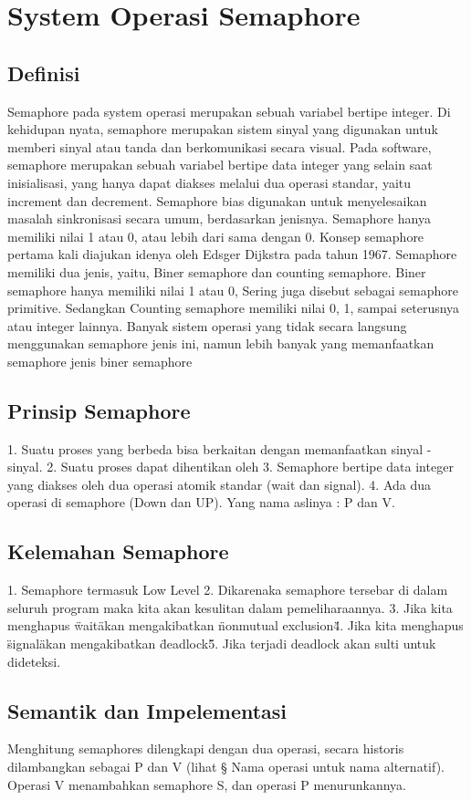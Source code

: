 \section{System Operasi Semaphore}
\subsection{Definisi}
Semaphore pada system operasi merupakan sebuah variabel bertipe integer. Di kehidupan nyata, semaphore merupakan sistem sinyal yang
digunakan untuk memberi sinyal atau tanda dan berkomunikasi secara visual. Pada software, semaphore merupakan sebuah variabel bertipe data
integer yang selain saat inisialisasi, yang hanya dapat diakses melalui dua operasi standar, yaitu increment dan decrement. Semaphore bias
digunakan untuk menyelesaikan masalah sinkronisasi secara umum, berdasarkan jenisnya. Semaphore hanya memiliki nilai 1 atau 0, atau lebih
dari sama dengan 0. Konsep semaphore pertama kali diajukan idenya oleh Edsger Dijkstra pada tahun 1967. Semaphore memiliki dua jenis,
yaitu, Biner semaphore dan counting semaphore. Biner semaphore hanya memiliki nilai 1 atau 0, Sering juga disebut sebagai semaphore
primitive. Sedangkan Counting semaphore memiliki nilai 0, 1, sampai seterusnya atau integer lainnya. Banyak sistem operasi yang tidak
secara langsung menggunakan semaphore jenis ini, namun lebih banyak yang memanfaatkan semaphore jenis biner semaphore

\subsection{Prinsip Semaphore}
1. Suatu proses yang berbeda bisa berkaitan dengan memanfaatkan sinyal - sinyal.
2. Suatu proses dapat dihentikan oleh 
3. Semaphore bertipe data integer yang diakses oleh dua operasi atomik standar (wait dan signal).
4. Ada dua operasi di semaphore (Down dan UP). Yang nama aslinya : P dan V.

\subsection{Kelemahan Semaphore}
1. Semaphore termasuk Low Level
2. Dikarenaka semaphore tersebar di dalam seluruh program maka kita akan kesulitan dalam pemeliharaannya.
3. Jika kita menghapus \"wait\" akan mengakibatkan \"nonmutual exclusion\"
4. Jika kita menghapus \"signal\" akan mengakibatkan \"deadlock\"
5. Jika terjadi deadlock akan sulti untuk dideteksi.

\subsection{Semantik dan Impelementasi}
Menghitung semaphores dilengkapi dengan dua operasi, secara historis dilambangkan sebagai P dan V (lihat § Nama operasi untuk nama alternatif). Operasi V 
menambahkan semaphore S, dan operasi P menurunkannya.

